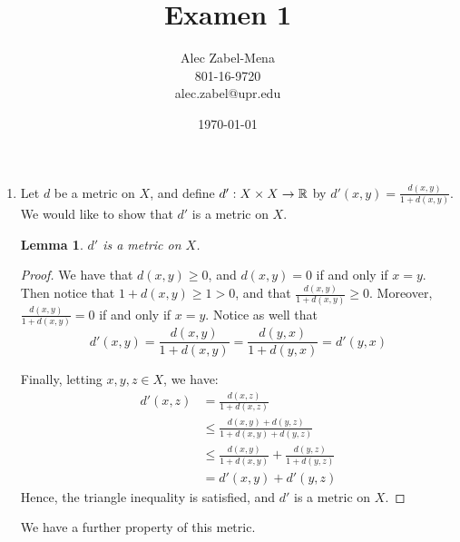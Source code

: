 \documentclass[12pt]{book}
\title{Examen 1}
\author{Alec Zabel-Mena\\ 801-16-9720 \\
alec.zabel@upr.edu}
\date{\today}
\theoremstyle{plain}
\newtheorem{lemma}[theorem]{Lemma}
\theoremstyle{plain} %
\theoremstyle{definition}
\theoremstyle{remark}
\begin{document}
\maketitle



\begin{enumerate}[label=(\arabic*)]
    \item Let $d$ be a metric on  $X$, and define  $d':X \times X \rightarrow \mathbb{R}$ by
        $d'(x,y)=\frac{d(x,y)}{1+d(x,y)}$. We would like to show that $d'$ is a metric on  $X$.

        \begin{lemma}\label{0.0.1}
            $d'$ is a metric on  $X$.
        \end{lemma}
        \begin{proof}
            We have that $d(x,y) \geq 0$, and $d(x,y)=0$ if and only if $x=y$. Then notice that
            $1+d(x,y) \geq 1 > 0$, and that $ \frac{d(x,y)}{1+d(x,y)} \geq 0$. Moreover,
            $\frac{d(x,y)}{1+d(x,y)}=0$ if and only if $x=y$. Notice as well that
                \begin{equation*}
                    d'(x,y)=\frac{d(x,y)}{1+d(x,y)}=\frac{d(y,x)}{1+d(y,x)}=d'(y,x)
                \end{equation*}

            Finally, letting $x,y,z \in X$, we have:
                \begin{align*}
                    d'(x,z) &= \frac{d(x,z)}{1+d(x,z)} \\
                            &\leq \frac{d(x,y)+d(y,z)}{1+d(x,y)+d(y,z)} \\
                            &\leq \frac{d(x,y)}{1+d(x,y)}+\frac{d(y,z)}{1+d(y,z)} \\
                            &= d'(x,y)+d'(y,z)
                \end{align*}
            Hence, the triangle inequality is satisfied, and $d'$ is a metric on  $X$.
        \end{proof}

        We have a further property of this metric.


\end{enumerate}
\end{document}
